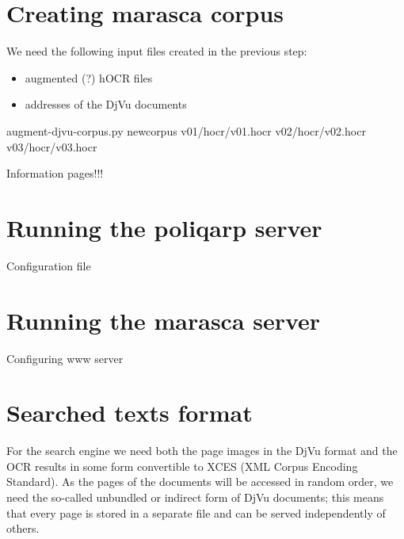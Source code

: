 \documentclass[runningheads,a4paper]{llncs}
\begin{document}
\section{Creating marasca corpus}
\label{sec:creat-marasca-corp}

We need the following input files created in the previous step:

\begin{itemize}
\item augmented (?) hOCR files
\item addresses of the DjVu documents 
\end{itemize}

augment-djvu-corpus.py newcorpus v01/hocr/v01.hocr v02/hocr/v02.hocr v03/hocr/v03.hocr

Information pages!!!

\section{Running the poliqarp server}
\label{sec:runn-poliq-serv}

Configuration file

\section{Running the marasca server}
\label{sec:runn-marasca-serv}

Configuring www server

\section{Searched texts format}
\label{sec:search-text-format}

For the search engine we need both the page images in the DjVu format
and the OCR results in some form convertible to XCES (XML Corpus
Encoding Standard). As the pages of the documents will be accessed in
random order, we need the so-called unbundled or indirect form of DjVu
documents; this means that every page is stored in a separate file and
can be served independently of others.
\end{document}
